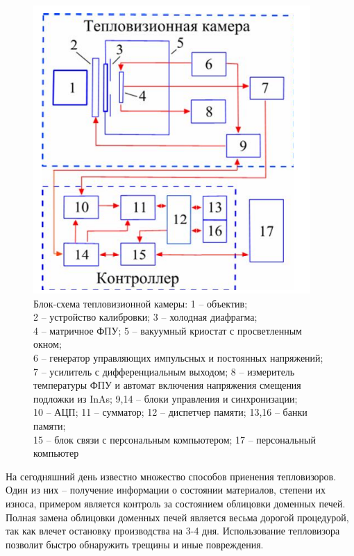 \documentclass[14pt, a4paper]{extreport}
\begin{document}
	\begin{figure}[h!]
		\centering
		\includegraphics[width = \textwidth]{image/chapter_1/MatrixIRCameraScheme}	
		\caption{Блок-схема тепловизионной камеры: 1 -- объектив;\\2 -- устройство калибровки; 3 -- холодная диафрагма;\\4 -- матричное ФПУ; 5 -- вакуумный криостат с просветленным окном;\\6 -- генератор управляющих импульсных и постоянных напряжений;\\7 -- усилитель с дифференциальным выходом; 8 -- измеритель температуры ФПУ и автомат включения напряжения смещения подложки из InAs; 9,14 -- блоки управления и синхронизации;\\10 -- АЦП; 11 -- сумматор; 12 -- диспетчер памяти; 13,16 -- банки памяти;\\15 -- блок связи с персональным компьютером; 17 -- персональный компьютер}
		\label{fig:MatrixIRCameraScheme}
	\end{figure}

	На сегодняшний день известно множество способов приенения тепловизоров. Один из них -- получение информации о состоянии материалов, степени их износа, примером является контроль за состоянием облицовки доменных печей. Полная замена облицовки доменных печей является весьма дорогой процедурой, так как влечет остановку производства на 3-4 дня. Использование тепловизора позволит быстро обнаружить трещины и иные повреждения.
	
\end{document}
